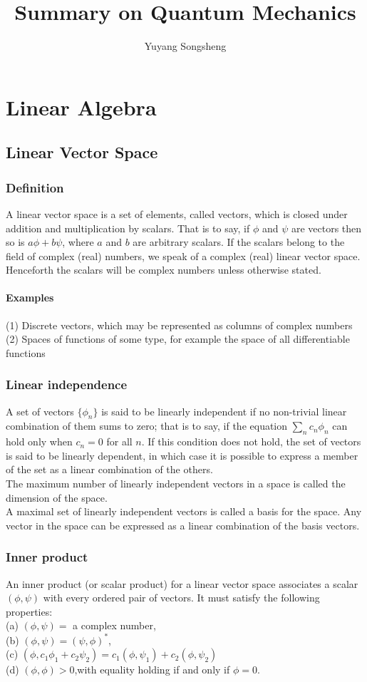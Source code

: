 \documentclass{article}
\author{Yuyang Songsheng}
\title{Summary on Quantum Mechanics}
\begin{document}
\maketitle
\section{Linear Algebra}
\subsection{Linear Vector Space}
\subsubsection{Definition}
A linear vector space is a set of elements, called vectors, which is closed under addition and multiplication by scalars. That is to say, if $\phi$ and $\psi$ are vectors then so is $a\phi+b\psi$, where $a$ and $b$ are arbitrary scalars. If the scalars belong to the field of complex (real) numbers, we speak of a complex (real) linear vector space. Henceforth the scalars will be complex numbers unless otherwise stated.
\paragraph{Examples}
(1) Discrete vectors, which may be represented as columns of complex
numbers\\
(2) Spaces of functions of some type, for example the space of all differentiable functions

\subsubsection{Linear independence}
A set of vectors $\{\phi_n\}$ is said to be linearly independent if no non-trivial linear combination of them sums to zero; that is to say, if the equation $\sum_{n} c_n \phi_n$ can hold only when $c_n=0$ for all $n$. If this condition does not hold, the set of
vectors is said to be linearly dependent, in which case it is possible to express a member of the set as a linear combination of the others.\\
The maximum number of linearly independent vectors in a space is called the dimension of the space. \\
A maximal set of linearly independent vectors is called a basis for the space. Any vector in the space can be expressed as a linear combination of the basis vectors.

\subsubsection{Inner product}
An inner product (or scalar product) for a linear vector space associates a scalar $(\phi,\psi)$ with every ordered pair of vectors. 
It must satisfy the following properties:\\
(a) $(\phi,\psi) = $ a complex number, \\
(b) $(\phi,\psi) = (\psi,\phi)^*$,\\
(c) $(\phi,c_1\phi_1 + c_2\psi_2) = c_1(\phi,\psi_1) + c_2(\phi,\psi_2)$\\
(d) $(\phi,\phi)>0$,with equality holding if and only if $\phi=0$.\\
\end{document}
